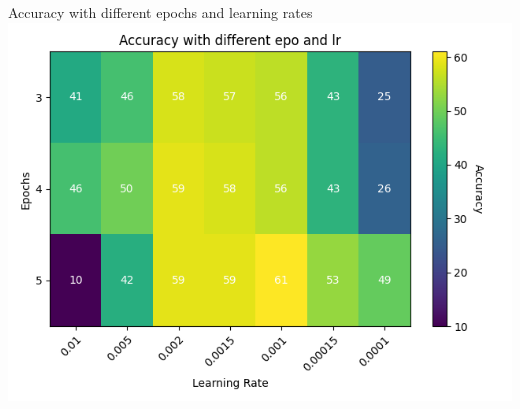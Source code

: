 \begin{frame}{Accuracy with different epochs and learning rates}
    \includegraphics[scale=.5]{images/accuracy with different epo and lr.png}
\end{frame}

